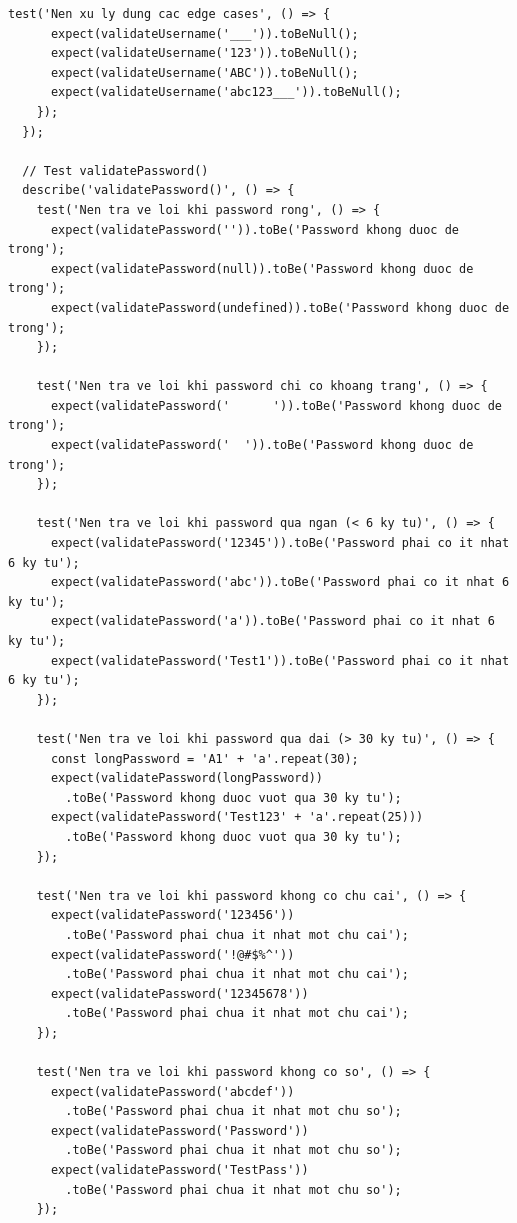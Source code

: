 \begin{lstlisting}[caption=Frontend Login Validation Tests]
    test('Nen xu ly dung cac edge cases', () => {
      expect(validateUsername('___')).toBeNull();
      expect(validateUsername('123')).toBeNull();
      expect(validateUsername('ABC')).toBeNull();
      expect(validateUsername('abc123___')).toBeNull();
    });
  });

  // Test validatePassword()
  describe('validatePassword()', () => {
    test('Nen tra ve loi khi password rong', () => {
      expect(validatePassword('')).toBe('Password khong duoc de trong');
      expect(validatePassword(null)).toBe('Password khong duoc de trong');
      expect(validatePassword(undefined)).toBe('Password khong duoc de trong');
    });
    
    test('Nen tra ve loi khi password chi co khoang trang', () => {
      expect(validatePassword('      ')).toBe('Password khong duoc de trong');
      expect(validatePassword('  ')).toBe('Password khong duoc de trong');
    });
    
    test('Nen tra ve loi khi password qua ngan (< 6 ky tu)', () => {
      expect(validatePassword('12345')).toBe('Password phai co it nhat 6 ky tu');
      expect(validatePassword('abc')).toBe('Password phai co it nhat 6 ky tu');
      expect(validatePassword('a')).toBe('Password phai co it nhat 6 ky tu');
      expect(validatePassword('Test1')).toBe('Password phai co it nhat 6 ky tu');
    });
    
    test('Nen tra ve loi khi password qua dai (> 30 ky tu)', () => {
      const longPassword = 'A1' + 'a'.repeat(30);
      expect(validatePassword(longPassword))
        .toBe('Password khong duoc vuot qua 30 ky tu');
      expect(validatePassword('Test123' + 'a'.repeat(25)))
        .toBe('Password khong duoc vuot qua 30 ky tu');
    });
    
    test('Nen tra ve loi khi password khong co chu cai', () => {
      expect(validatePassword('123456'))
        .toBe('Password phai chua it nhat mot chu cai');
      expect(validatePassword('!@#$%^'))
        .toBe('Password phai chua it nhat mot chu cai');
      expect(validatePassword('12345678'))
        .toBe('Password phai chua it nhat mot chu cai');
    });
    
    test('Nen tra ve loi khi password khong co so', () => {
      expect(validatePassword('abcdef'))
        .toBe('Password phai chua it nhat mot chu so');
      expect(validatePassword('Password'))
        .toBe('Password phai chua it nhat mot chu so');
      expect(validatePassword('TestPass'))
        .toBe('Password phai chua it nhat mot chu so');
    });
    

\end{lstlisting}
